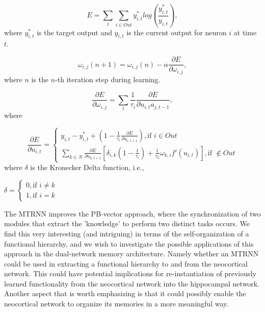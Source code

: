 \begin{equation}\label{Kullback_Leibler_divergence}
    E = \sum_t \sum_{i \in Out} y_{i,t}^* log(\frac{y_{i,t}^*}{y_{i,t}}),
\end{equation}
where $y_{i,t}^*$ is the target output and $y_{i,t}$ is the current output for neuron $i$ at time $t$.

\begin{equation}
    \omega_{i,j}(n+1) = \omega_{i,j}(n) - \alpha\frac{\partial E}{\partial \omega_{i,j}},
\end{equation}
where $n$ is the $n$-th iteration step during learning.

\begin{equation}
    \frac{\partial E}{\partial \omega_{i,j}} = \sum_{t} \frac{1}{\tau_i}\frac{\partial E}{\partial u_{i,t}a_{j,t-1}},
\end{equation}
where

\begin{equation}
    \frac{\partial E}{\partial u_{i,t}} = \begin{cases}
        y_{i,t} - y_{i,t}^* + (1-\frac{1}{\tau_i} \frac{\partial E}{\partial u_{i,t+1}}), \text{if $i \in Out$} \\
        \sum_{k \in N}\frac{\partial E}{\partial u_{k,t+1}}[\delta_{i,k}(1-\frac{1}{\tau_i})+\frac{1}{\tau_k}\omega_{k,i}f'(u_{i,t})], \text{if $\notin Out$}
   \end{cases}
\end{equation}
where $\delta$ is the Kronecker Delta function, i.e.,

\begin{center}
\begin{math}
    \delta = \begin{cases}
        0, \text{if $i \neq k$} \\
        1, \text{if $i = k$}
    \end{cases}
\end{math}
\end{center}

The MTRNN improves the PB-vector approach, where the synchronization of two modules that extract the 'knowledge' to perform two distinct tasks occurs. We find this very interesting (and intriguing) in terms of the self-organization of a functional hierarchy, and we wish to investigate the possible applications of this approach in the dual-network memory architecture. Namely whether an MTRNN could be used in extracting a functional hierarchy to and from the neocortical network. This could have potential implications for re-instantiation of previously learned functionality from the neocortical network into the hippocampal network. Another aspect that is worth emphasizing is that it could possibly enable the neocortical network to organize its memories in a more meaningful way.


